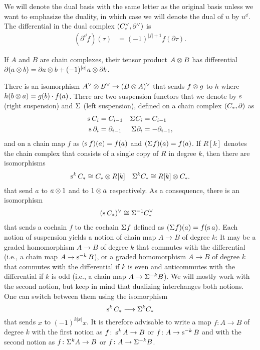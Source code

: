 We will denote the dual basis with the same letter as the original basis unless we want to emphasize the duality, in which case we will denote the dual of $u$ by $u^\dd$. The differential in the dual complex $(\ucocadenas,\partial^\dd)$ is
\begin{align*}
	(\partial^\dd f)(\tau) &= (-1)^{|f|+1} f(\partial \tau). %
\end{align*}
\begin{convention}
	If $A$ and $B$ are chain complexes, their tensor product $A \ot B$ has differential $\partial(a \ot b) = \partial a \ot b + (-1)^{|a|}a \ot \partial b$.
\end{convention}
	There is an isomorphism $A^\dd \ot B^\dd \to (B \ot A)^{\dd}$ that sends $f \ot g$ to $h$ where $h(b \ot a) = g(b)\cdot f(a)$. There are two suspension functors that we denote by $\sus{}$ (right suspension) and $\susp{}$ (left suspension), defined on a chain complex $(\ucadenas,\partial)$ as
\begin{align*}
	\sus{} \ucadenas[i] &= \ucadenas[i-1] & \susp{} \ucadenas[i] &= \ucadenas[i-1] \\
	\sus{} \partial_i &= \partial_{i-1} & \susp{} \partial_i &= -\partial_{i-1},
\end{align*}
and on a chain map $f$ as $(\sus{}f)(a) = f(a)$ and $(\susp{} f)(a) = f(a)$. If $R[k]$ denotes the chain complex that consists of a single copy of $R$ in degree $k$, then there are isomorphisms
\begin{align*}
	\sus{k} \ucadenas &\cong \ucadenas \ot R[k] & \susp{k} \ucadenas \cong R[k] \ot \ucadenas.
\end{align*}
that send $a$ to $a \ot 1$ and to $1 \ot a$ respectively. As a consequence, there is an isomorphism
\begin{align*}
(\sus{}\ucadenas )^\dd &\cong \susp{-1}\ucocadenas
\end{align*}
that sends a cochain $f$ to the cochain $\susp{}f$ defined as $(\susp{}f)(a) = f(\sus{}a)$.
Each notion of suspension yields a notion of chain map $A \to B$ of degree $k$: It may be a graded homomorphism $A \to B$ of degree $k$ that commutes with the differential (i.e., a chain map $A \to \sus{-k} B$), or a graded homomorphism $A \to B$ of degree $k$ that commutes with the differential if $k$ is even and anticommutes with the differential if $k$ is odd (i.e., a chain map $A \to \susp{-k}B$). We will mostly work with the second notion, but keep in mind that dualizing interchanges both notions. One can switch between them using the isomorphism
\[
\sus{k}\ucadenas \lra \susp{k}\ucadenas
\]
that sends $x$ to $(-1)^{k|x|}x$. It is therefore advisable to write a map $f \colon A \to B$ of degree $k$ with the first notion as $f \colon \sus{k}A \to B$ or $f \colon A \to \sus{-k}B$ and with the second notion as $f \colon \susp{k}A \to B$ or $f \colon A \to \susp{-k}B$.

